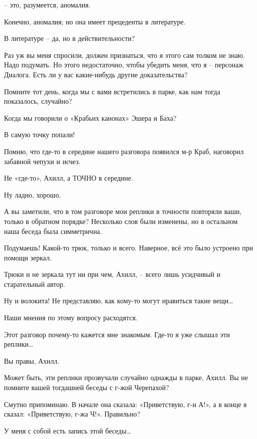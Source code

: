 \documentclass[../main.tex]{subfiles}
\begin{document}
\begin{dialogue}
 \--- это, разумеется, аномалия.

 Конечно, аномалия; но она имеет прецеденты в литературе.

 В литературе \--- да, но в действительности?

 Раз уж вы меня спросили, должен признаться, что я этого сам толком не знаю. Надо подумать. Но этого недостаточно, чтобы убедить меня, что я \--- персонаж Диалога. Есть ли у вас какие-нибудь другие доказательства?

 Помните тот день, когда мы с вами встретились в парке, как нам тогда показалось, случайно?

 Когда мы говорили о «Крабьих канонах» Эшера и Баха?

 В самую точку попали!

 Помню, что где-то в середине нашего разговора появился м-р Краб, наговорил забавной чепухи и исчез.

 Не «где-то», Ахилл, а ТОЧНО в середине.

 Ну ладно, хорошо.

 А вы заметили, что в том разговоре мои реплики в точности повторяли ваши, только в обратном порядке? Несколько слов были изменены, но в остальном наша беседа была симметрична.

 Подумаешь! Какой-то трюк, только и всего. Наверное, всё это было устроено при помощи зеркал.

 Трюки и не зеркала тут ни при чем, Ахилл, \--- всего лишь усидчивый и старательный автор.

 Ну и волокита! Не представляю, как кому-то могут нравиться такие вещи\ldots{}

 Наши мнения по этому вопросу расходятся.

 Этот разговор почему-то кажется мне знакомым. Где-то я уже слышал эти реплики\ldots{}

 Вы правы, Ахилл.

 Может быть, эти реплики прозвучали случайно однажды в парке, Ахилл. Вы не помните вашей тогдашней беседы с г-жой Черепахой?

 Смутно припоминаю. В начале она сказала: «Приветствую, г-н А!», а в конце я сказал: «Приветствую, г-жа Ч!». Правильно?

 У меня с собой есть запись этой беседы\ldots{}


\end{dialogue}
\end{document}
